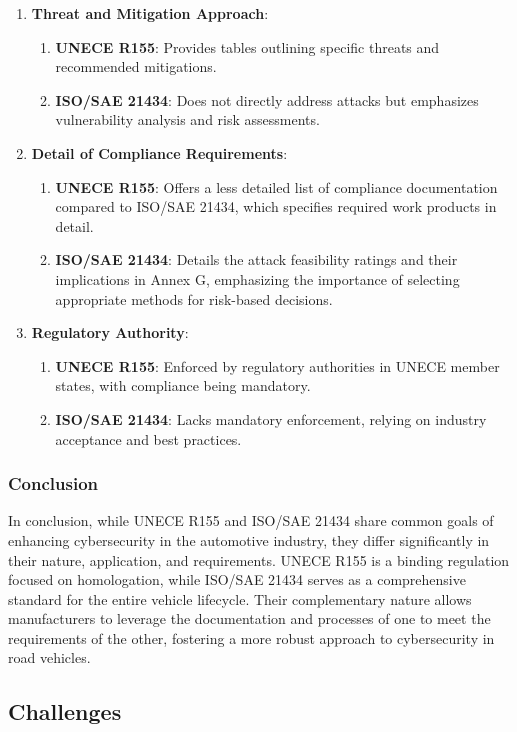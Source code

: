 \begin{enumerate}
    \item \textbf{Threat and Mitigation Approach}:
    \begin{enumerate}
        \item \textbf{UNECE R155}: Provides tables outlining specific threats and recommended mitigations.
        \item \textbf{ISO/SAE 21434}: Does not directly address attacks but emphasizes vulnerability analysis and risk assessments.
    \end{enumerate}

    \item \textbf{Detail of Compliance Requirements}:
    \begin{enumerate}
        \item \textbf{UNECE R155}: Offers a less detailed list of compliance documentation compared to ISO/SAE 21434, which specifies required work products in detail.
        \item \textbf{ISO/SAE 21434}: Details the attack feasibility ratings and their implications in Annex G, emphasizing the importance of selecting appropriate methods for risk-based decisions.
    \end{enumerate}

    \item \textbf{Regulatory Authority}:
    \begin{enumerate}
        \item \textbf{UNECE R155}: Enforced by regulatory authorities in UNECE member states, with compliance being mandatory.
        \item \textbf{ISO/SAE 21434}: Lacks mandatory enforcement, relying on industry acceptance and best practices.
    \end{enumerate}
\end{enumerate}

\subsubsection{Conclusion}\label{subsec:conclusion}

In conclusion, while UNECE R155 and ISO/SAE 21434 share common goals of enhancing cybersecurity in the automotive industry, they differ significantly in their nature, application, and requirements.
UNECE R155 is a binding regulation focused on homologation, while ISO/SAE 21434 serves as a comprehensive standard for the entire vehicle lifecycle.
Their complementary nature allows manufacturers to leverage the documentation and processes of one to meet the requirements of the other, fostering a more robust approach to cybersecurity in road vehicles.

\subsection{Challenges}\label{subsec:future-needs-and-challenges}
